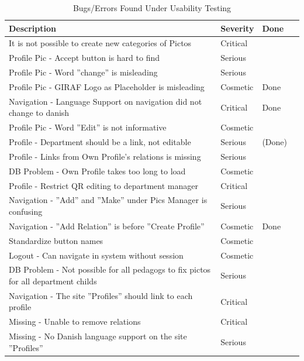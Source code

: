 	
\begin{table}[htbp]
	\centering
		\begin{tabular}{|l|l|l|l|}
			\hline
			Description & Severity & Done\\\hline\hline
			It is not possible to create new categories of Pictos & Critical &\\\hline
			Profile Pic - Accept button is hard to find & Serious &\\\hline
			Profile Pic - Word ''change'' is misleading & Serious &\\\hline
			Profile Pic - GIRAF Logo as Placeholder is misleading  & Cosmetic & Done\\\hline
			Navigation - Language Support on navigation did not change to danish & Critical & Done\\\hline
			Profile Pic - Word ''Edit'' is not informative & Cosmetic &\\\hline
			Profile - Department should be a link, not editable & Serious & (Done)\\\hline
			Profile - Links from Own Profile's relations is missing & Serious & \\\hline
			DB Problem - Own Profile takes too long to load & Cosmetic &  \\\hline
			Profile - Restrict QR editing to department manager & Critical &  \\\hline 
			Navigation - ''Add'' and ''Make'' under Pics Manager is confusing & Serious & \\\hline
			Navigation - ''Add Relation''  is before ''Create Profile'' & Cosmetic & Done \\\hline
			Standardize button names & Cosmetic & \\\hline
			Logout - Can navigate in system without session & Cosmetic & \\\hline
			DB Problem - Not possible for all pedagogs to fix pictos for all department childs & Serious & \\\hline
			Navigation - The site ''Profiles'' should link to each profile & Critical &\\\hline
			Missing - Unable to remove relations & Critical & \\\hline
			Missing - No Danish language support on the site ''Profiles''& Serious &\\\hline
	\end{tabular}
	\caption{Bugs/Errors Found Under Usability Testing}
	\label{tab:Bugs/Errors}
\end{table}

